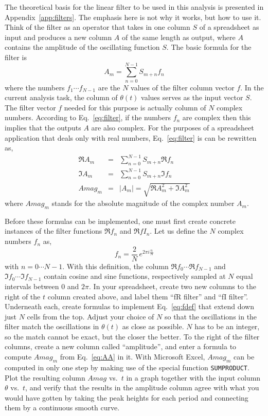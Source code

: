 \documentclass{revtex4}
\begin{document}
The theoretical basis for the linear filter to be used in this analysis is
presented in Appendix~\ref{app:filters}.  The emphasis here is not why it
works, but how to use it.  Think of the filter as an operator that takes
in one column $S$ of a spreadsheet as input and produces a new column $A$
of the same length as output, where $A$ contains the amplitude of the
oscillating function $S$.  The basic formula for the filter is
\begin{equation}
A_m = \sum_{n=0}^{N-1} S_{m+n} f_n
\label{eq:filter}
\end{equation}
where the numbers $f_1\cdots f_{N-1}$ are the $N$ values of the filter
column vector $f$.  In the current analysis task, the column of $\theta(t)$
values serves as the input vector $S$.  The filter vector $f$ needed for
this purpose is actually column of $N$ complex numbers.  According to
Eq.~\ref{eq:filter}, if the numbers $f_n$ are complex then this implies
that the outputs $A$ are also complex.  For the purposes of a spreadsheet
application that deals only with real numbers, Eq.~\ref{eq:filter} is can
be rewritten as,
\begin{eqnarray}
\Re{A}_m &=& \sum_{n=0}^{N-1} S_{m+n} \Re{f}_n \nonumber \\
\Im{A}_m &=& \sum_{n=0}^{N-1} S_{m+n} \Im{f}_n \nonumber \\
Amag_m &=& |A_m| = \sqrt{\Re{A}_m^2 + \Im{A}_m^2}
\label{eq:AA}
\end{eqnarray}
where $Amag_m$ stands for the absolute magnitude of
the complex number $A_m$.

Before these formulas can be implemented, one must first create concrete
instances of the filter functions $\Re{f}_n$ and $\Re{fI}_n$. 
Let us define the $N$ complex numbers $f_n$ as,
\begin{equation}
f_n = \frac{2}{N}\,e^{2\pi i\frac{n}{N}}
\label{eq:fdef}
\end{equation}
with $n=0\cdots N-1$.  With this definition, the column $\Re{f}_0\cdots
\Re{f}_{N-1}$ and $\Im{f}_0\cdots \Im{f}_{N-1}$
contain cosine and sine functions, respectively
sampled at $N$ equal intervals between 0 and $2\pi$.  In your spreadsheet,
create two new columns to the right of the $t$ column created above, and
label them ``fR filter'' and ``fI filter''.  Underneath each, create formulas
to implement Eq.~\ref{eq:fdef} that extend down just $N$ cells from the top.
Adjust your choice of $N$ so that the oscillations in the filter match the
oscillations in $\theta(t)$ as close as possible.  $N$ has to be an integer,
so the match cannot be exact, but the closer the better.  To the right of
the filter columns, create a new column called ``amplitude'', and enter a
formula to compute $Amag_m$ from Eq.~\ref{eq:AA} in it.  With Microsoft Excel,
$Amag_m$ can be computed in only one step by making use of the special function
{\tt SUMPRODUCT}.  Plot the resulting column $Amag$ vs.\ $t$ in a graph
together with the input column $\theta$ vs.\ $t$, and verify that the
results in the amplitude column agree with what you would have gotten
by taking the peak heights for each period and connecting them by a
continuous smooth curve.
\end{document}

